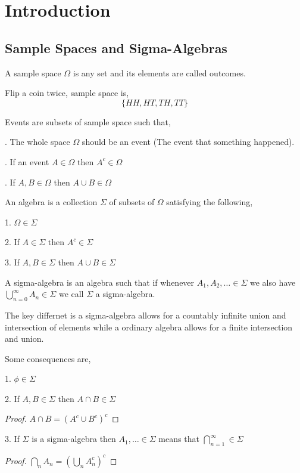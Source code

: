 \chapter{Introduction}
\section{Sample Spaces and Sigma-Algebras}

\begin{definition}
    A sample space $\Omega$ is any set and its elements are called outcomes.
\end{definition}

\begin{eg}
    Flip a coin twice, sample space is, 
    $$ \{HH, HT, TH, TT\} $$ 
\end{eg}

Events are subsets of sample space such that, 

. The whole space $\Omega$ should be an event (The event that something happened).

. If an event $A \in \Omega$ then $A^c \in \Omega$

.  If $A,B \in \Omega$ then $A \cup B \in \Omega$


\begin{definition}[Algebra]
    An algebra is a collection $\Sigma$ of subsets of $\Omega$ satisfying the following, 

    1. $\Omega \in \Sigma$

    2.  If  $A \in \Sigma$ then $A^c \in \Sigma$ 

    3. If $A,B \in \Sigma$ then $A \cup B \in \Sigma$
\end{definition}

\begin{definition}
    A sigma-algebra is an algebra such that if whenever $A_1,A_2,\dots \in \Sigma$ we also have $\bigcup_{n = 0}^{\infty} A_n \in \Sigma$ we call $\Sigma$ a sigma-algebra.
\end{definition}
\begin{remark}
    The key differnet is a sigma-algebra allows for a countably infinite union and intersection of elements while a ordinary algebra allows for a finite intersection and union.
\end{remark}
\begin{remark}
    
\end{remark}

Some consequences are, 
    \item 1. $\phi \in \Sigma$
    \item 2. If $A,B \in \Sigma$ then $A\cap B \in \Sigma$ 
        \begin{proof}
            $A\cap B= (A^c \cup B^c)^c$
        \end{proof}
    \item 3. If $\Sigma$ is a sigma-algebra then $A_1,\dots \in \Sigma$ means that $\bigcap_{n=1}^{\infty} \in \Sigma$
         \begin{proof}
            $\bigcap_n A_n=  (\bigcup_n A_n^c)^c$
        \end{proof}


